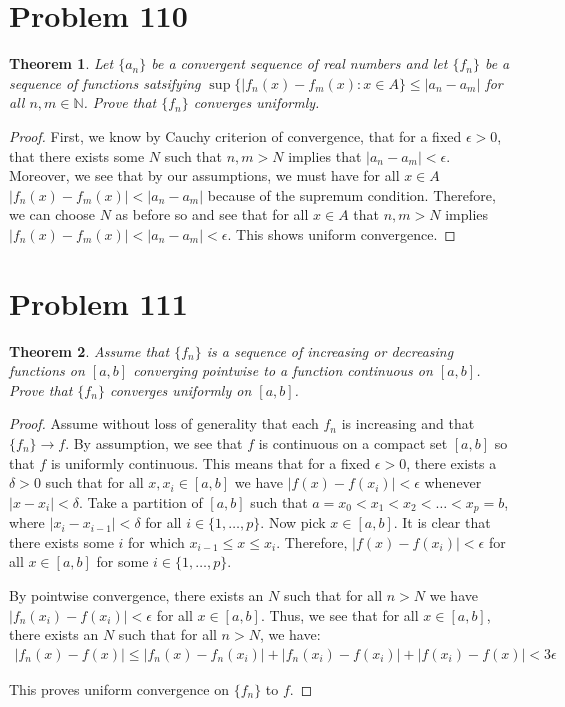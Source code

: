 \documentclass[psamsfonts]{amsart}
\newtheorem{thm}{Theorem}[section]
\theoremstyle{definition}
\theoremstyle{remark}
\numberwithin{equation}{section}
\begin{document}
\section{Problem 110}

\begin{thm}
Let $\{ a_n \}$ be a convergent sequence of real numbers and let $\{ f_n \}$ be a sequence of functions satsifying $\sup \{ |f_n(x) - f_m(x): x \in A \} \leq |a_n - a_m |$ for all $n,m \in \mathbb{N}$. Prove that $\{ f_n \}$ converges uniformly.
\end{thm}

\begin{proof}
First, we know by Cauchy criterion of convergence, that for a fixed $\epsilon > 0$, that there exists some $N$ such that $n,m > N$ implies that $|a_n - a_m| < \epsilon$. Moreover, we see that by our assumptions, we must have for all $x \in A$  $|f_n(x) - f_m(x)| < |a_n - a_m|$ because of the supremum condition. Therefore, we can choose $N$ as before so and see that for all $x \in A$ that $n,m > N$ implies $|f_n(x) - f_m(x)| < |a_n - a_m | < \epsilon$. This shows uniform convergence.
\end{proof}

\section{Problem 111}

\begin{thm}
Assume that $\{ f_n \}$ is a sequence of increasing or decreasing functions on $[a,b]$ converging pointwise to a function continuous on $[a,b]$. Prove that $\{ f_n \}$ converges uniformly on $[a,b]$.
\end{thm}

\begin{proof}
Assume without loss of generality that each $f_n$ is increasing and that $\{ f_n \} \rightarrow f$. By assumption, we see that $f$ is continuous on a compact set $[a,b]$ so that $f$ is uniformly continuous. This means that for a fixed $\epsilon > 0$, there exists a $\delta > 0$ such that for all $x, x_i \in [a,b]$ we have $|f(x) - f(x_i)| < \epsilon$ whenever $|x - x_i | < \delta$. Take a partition of $[a,b]$ such that $a = x_0 < x_1 < x_2 < \ldots < x_p = b$, where $|x_i - x_{i-1}| < \delta$ for all $i \in \{1, \ldots, p \}$. Now pick $x \in [a,b]$. It is clear that there exists some $i$ for which $x_{i-1} \leq x \leq x_i$. Therefore, $|f(x) - f(x_i)| < \epsilon$ for all $x \in [a,b]$ for some $i \in \{1, \ldots, p \}$. 

By pointwise convergence, there exists an $N$ such that for all $n > N$ we have $|f_n(x_i) - f(x_i) | < \epsilon$ for all $x \in [a,b]$. Thus, we see that for all $x \in [a,b]$, there exists an $N$ such that for all $n > N$, we have:
\begin{eqnarray}
|f_n(x) - f(x)| \leq |f_n(x) - f_n(x_i)| + |f_n(x_i) - f(x_i)| + |f(x_i) - f(x)| < 3 \epsilon
\end{eqnarray} 

This proves uniform convergence on $\{ f_n \}$ to $f$.
\end{proof}
\end{document}
